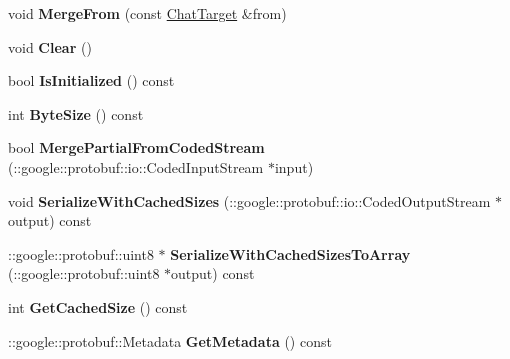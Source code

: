 \begin{DoxyCompactItemize}
\item 
\hypertarget{classSimpleChat_1_1ChatTarget_aea2cc4d829f43be963fe5e5281c58b88}{void {\bfseries Merge\-From} (const \hyperlink{classSimpleChat_1_1ChatTarget}{Chat\-Target} \&from)}\label{classSimpleChat_1_1ChatTarget_aea2cc4d829f43be963fe5e5281c58b88}

\item 
\hypertarget{classSimpleChat_1_1ChatTarget_a0172176ef83d2e89f8e42e76021b8519}{void {\bfseries Clear} ()}\label{classSimpleChat_1_1ChatTarget_a0172176ef83d2e89f8e42e76021b8519}

\item 
\hypertarget{classSimpleChat_1_1ChatTarget_aa8e4da7087df9548ab7e20909b9b4ccd}{bool {\bfseries Is\-Initialized} () const }\label{classSimpleChat_1_1ChatTarget_aa8e4da7087df9548ab7e20909b9b4ccd}

\item 
\hypertarget{classSimpleChat_1_1ChatTarget_a9437724d77d2202440b3bb4e04f170cf}{int {\bfseries Byte\-Size} () const }\label{classSimpleChat_1_1ChatTarget_a9437724d77d2202440b3bb4e04f170cf}

\item 
\hypertarget{classSimpleChat_1_1ChatTarget_ab35d0ebdf526a521e3022d723abef84b}{bool {\bfseries Merge\-Partial\-From\-Coded\-Stream} (\-::google\-::protobuf\-::io\-::\-Coded\-Input\-Stream $\ast$input)}\label{classSimpleChat_1_1ChatTarget_ab35d0ebdf526a521e3022d723abef84b}

\item 
\hypertarget{classSimpleChat_1_1ChatTarget_a0e9d4cbc640da603feaebccbf1205115}{void {\bfseries Serialize\-With\-Cached\-Sizes} (\-::google\-::protobuf\-::io\-::\-Coded\-Output\-Stream $\ast$output) const }\label{classSimpleChat_1_1ChatTarget_a0e9d4cbc640da603feaebccbf1205115}

\item 
\hypertarget{classSimpleChat_1_1ChatTarget_a571dabbabfa13682a417763cf8295430}{\-::google\-::protobuf\-::uint8 $\ast$ {\bfseries Serialize\-With\-Cached\-Sizes\-To\-Array} (\-::google\-::protobuf\-::uint8 $\ast$output) const }\label{classSimpleChat_1_1ChatTarget_a571dabbabfa13682a417763cf8295430}

\item 
\hypertarget{classSimpleChat_1_1ChatTarget_ae7f5a171f96de9e6f48a5d066160b3af}{int {\bfseries Get\-Cached\-Size} () const }\label{classSimpleChat_1_1ChatTarget_ae7f5a171f96de9e6f48a5d066160b3af}

\item 
\hypertarget{classSimpleChat_1_1ChatTarget_aff7a0f604becdbd2c8c431741f38f48e}{\-::google\-::protobuf\-::\-Metadata {\bfseries Get\-Metadata} () const }\label{classSimpleChat_1_1ChatTarget_aff7a0f604becdbd2c8c431741f38f48e}


\end{DoxyCompactItemize}
